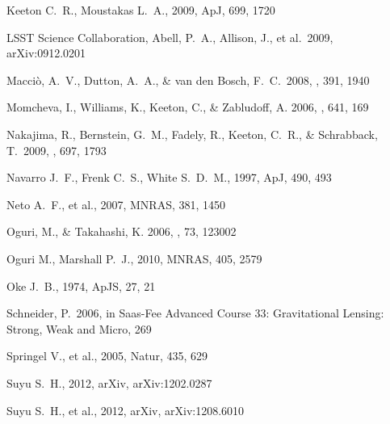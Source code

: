\begin{thebibliography}{99}
 Keeton C.~R., Moustakas L.~A., 2009, ApJ, 699, 1720 


 LSST 
Science Collaboration, Abell, P.~A., Allison, J., et al.\ 2009, 
arXiv:0912.0201 

 Macci{\`o}, A.~V., 
Dutton, A.~A., \& van den Bosch, F.~C.\ 2008, \mnras, 391, 1940 



{Momcheva}, I., {Williams}, K., {Keeton}, C., \& {Zabludoff}, A. 2006, \apj,
  641, 169

 Nakajima, R., 
Bernstein, G.~M., Fadely, R., Keeton, C.~R., 
\& Schrabback, T.\ 2009, \apj, 697, 1793 

 Navarro J.~F., Frenk C.~S., White S.~D.~M., 1997, ApJ, 490, 493 


Neto A.~F., et al., 2007, MNRAS, 381, 1450 


{Oguri}, M., \& {Takahashi}, K. 2006, \prd, 73, 123002

 Oguri M., Marshall P.~J., 2010, MNRAS, 405, 2579 


 Oke 
J.~B., 1974, ApJS, 27, 21 

 Schneider, P.\ 2006, 
in Saas-Fee Advanced Course 33: Gravitational Lensing: Strong, Weak and Micro, 
269 

 Springel V., et al., 2005, Natur, 435, 629 


 Suyu 
S.~H., 2012, arXiv, arXiv:1202.0287 


Suyu S.~H., et al., 2012, arXiv, arXiv:1208.6010 



\end{thebibliography}

